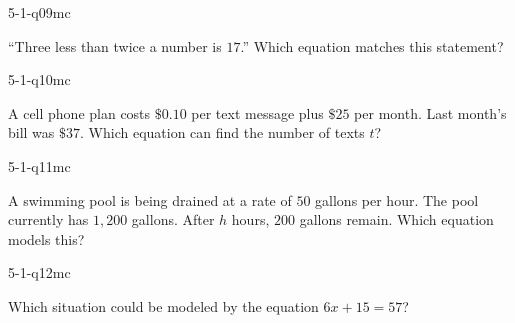 \begin{practiceQuestion}{5-1-q09}{mc}
\begin{questionText}
``Three less than twice a number is $17$.'' Which equation matches this statement?
\end{questionText}
\end{practiceQuestion}

\begin{practiceQuestion}{5-1-q10}{mc}
\begin{questionText}
A cell phone plan costs $\$0.10$ per text message plus $\$25$ per month. Last month's bill was $\$37$. Which equation can find the number of texts $t$?
\end{questionText}
\end{practiceQuestion}

\begin{practiceQuestion}{5-1-q11}{mc}
\begin{questionText}
A swimming pool is being drained at a rate of $50$ gallons per hour. The pool currently has $1{,}200$ gallons. After $h$ hours, $200$ gallons remain. Which equation models this?
\end{questionText}
\end{practiceQuestion}

\begin{practiceQuestion}{5-1-q12}{mc}
\begin{questionText}
Which situation could be modeled by the equation $6x + 15 = 57$?
\end{questionText}
\end{practiceQuestion}

